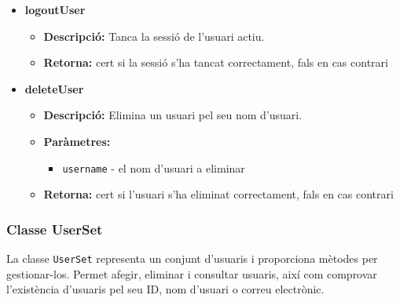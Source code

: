 \documentclass[a4paper, t]{article}
\begin{document}
\begin{itemize}
    \item \textbf{logoutUser}
    \begin{itemize}
        \item \textbf{Descripció:} Tanca la sessió de l'usuari actiu.
        \item \textbf{Retorna:} cert si la sessió s'ha tancat correctament, fals en cas contrari
    \end{itemize}

    \item \textbf{deleteUser}
    \begin{itemize}
        \item \textbf{Descripció:} Elimina un usuari pel seu nom d'usuari.
        \item \textbf{Paràmetres:}
        \begin{itemize}
            \item \texttt{username} - el nom d'usuari a eliminar
        \end{itemize}
        \item \textbf{Retorna:} cert si l'usuari s'ha eliminat correctament, fals en cas contrari
    \end{itemize}
\end{itemize}

\subsubsection{Classe UserSet}
La classe \texttt{UserSet} representa un conjunt d'usuaris i proporciona mètodes per gestionar-los. Permet afegir, eliminar i consultar usuaris, així com comprovar l'existència d'usuaris pel seu ID, nom d'usuari o correu electrònic.
\end{document}
